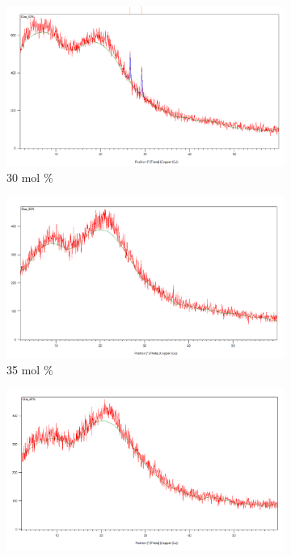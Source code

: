 \documentclass[12pt, a4paper]{article}
\begin{document}
\begin{figure}[h]
\centering

\begin{subfigure}[b]{0.23\textwidth}
  \centering
  \includegraphics[width=\linewidth]{30pro.png}
  \caption{30 mol \% }
  \label{fig:sub1}
\end{subfigure}
\hfill
\begin{subfigure}[b]{0.23\textwidth}
  \centering
  \includegraphics[width=\linewidth]{35pro.png}
  \caption{35 mol \% }
  \label{fig:sub2}
\end{subfigure}
\hfill
\begin{subfigure}[b]{0.23\textwidth}
  \centering
  \includegraphics[width=\linewidth]{40pro.png}

\end{subfigure}
\end{figure}
\end{document}

